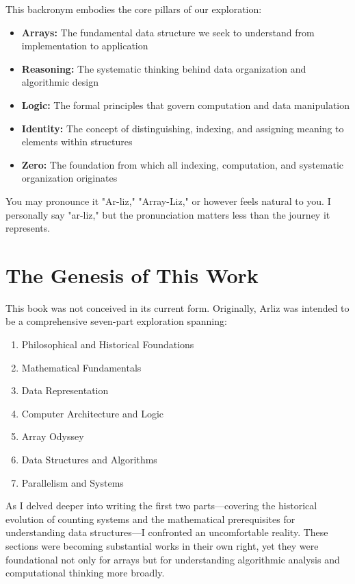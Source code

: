 This backronym embodies the core pillars of our exploration:
\begin{itemize}
	\item \textbf{Arrays:} The fundamental data structure we seek to understand from implementation to application
	\item \textbf{Reasoning:} The systematic thinking behind data organization and algorithmic design
	\item \textbf{Logic:} The formal principles that govern computation and data manipulation
	\item \textbf{Identity:} The concept of distinguishing, indexing, and assigning meaning to elements within structures
	\item \textbf{Zero:} The foundation from which all indexing, computation, and systematic organization originates
\end{itemize}

You may pronounce it "Ar-liz," "Array-Liz," or however feels natural to you. I personally say "ar-liz," but the pronunciation matters less than the journey it represents.

\section*{The Genesis of This Work}

This book was not conceived in its current form. Originally, Arliz was intended to be a comprehensive seven-part exploration spanning:

\begin{enumerate}
	\item Philosophical and Historical Foundations
	\item Mathematical Fundamentals
	\item Data Representation
	\item Computer Architecture and Logic
	\item Array Odyssey
	\item Data Structures and Algorithms
	\item Parallelism and Systems
\end{enumerate}

As I delved deeper into writing the first two parts—covering the historical evolution of counting systems and the mathematical prerequisites for understanding data structures—I confronted an uncomfortable reality. These sections were becoming substantial works in their own right, yet they were foundational not only for arrays but for understanding algorithmic analysis and computational thinking more broadly.

